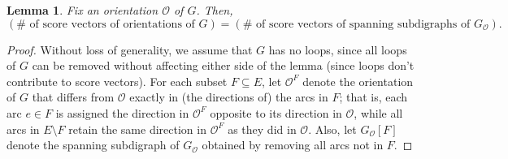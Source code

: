 \documentclass[12pt]{article}
\newtheorem{lemma}[theorem]{Lemma}
\theoremstyle{definition}
\theoremstyle{remark}
\newcommand{\Or}{\mathcal{O}}
\begin{document}
\begin{lemma}\label{lem:4=5}
     Fix an orientation $\mathcal{O}$ of $G$. Then,
     \[
     (\# \text{ of score vectors of orientations of $G$}) = (\# \text{ of score vectors of spanning subdigraphs of $G_{\Or}$}).
     \]
\end{lemma}

\begin{proof}
   Without loss of generality, we assume that $G$ has no loops, since all loops of $G$ can be removed without affecting either side of the lemma (since loops don't contribute to score vectors).
   For each subset $F \subseteq E$, let $\mathcal{O}^F$ denote the orientation of $G$ that differs from $\Or$ exactly in (the directions of) the arcs in $F$; that is, each arc $e \in F$ is assigned the direction in $\mathcal{O}^F$ opposite to its direction in $\mathcal{O}$, while all arcs in $E \setminus F$ retain the same direction in $\mathcal{O}^F$ as they did in $\mathcal{O}$.  Also, let $G_{\mathcal{O}}[F]$ denote the spanning subdigraph of $G_{\mathcal{O}}$ obtained by removing all arcs not in $F$.


\end{proof}
\end{document}
